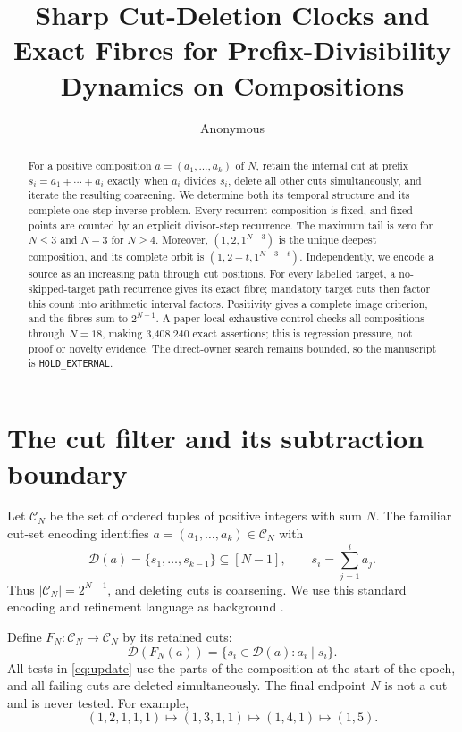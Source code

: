 \documentclass[a4paper,10pt]{amsart}
\title[Prefix-divisibility cut dynamics]{Sharp Cut-Deletion Clocks and Exact
Fibres for Prefix-Divisibility Dynamics on Compositions}
\author{Anonymous}
\date{}
\theoremstyle{remark}
\newcommand{\Comp}{\mathcal C}
\newcommand{\Cuts}{\mathcal D}
\begin{document}
\begin{abstract}
For a positive composition $a=(a_1,\ldots,a_k)$ of $N$, retain the internal
cut at prefix $s_i=a_1+\cdots+a_i$ exactly when $a_i$ divides $s_i$, delete
all other cuts simultaneously, and iterate the resulting coarsening.  We
determine both its temporal structure and its complete one-step inverse
problem.  Every recurrent composition is fixed, and fixed points are counted
by an explicit divisor-step recurrence.  The maximum tail is zero for
$N\leq3$ and $N-3$ for $N\geq4$.  Moreover,
$(1,2,1^{N-3})$ is the unique deepest composition, and its complete orbit is
$(1,2+t,1^{N-3-t})$.  Independently, we encode a source as an increasing
path through cut positions.  For every labelled target, a no-skipped-target
path recurrence gives its exact fibre; mandatory target cuts then factor this
count into arithmetic interval factors.  Positivity gives a complete image
criterion, and the fibres sum to $2^{N-1}$.  A paper-local exhaustive control
checks all compositions through $N=18$, making 3,408,240 exact assertions;
this is regression pressure, not proof or novelty evidence.  The direct-owner
search remains bounded, so the manuscript is \texttt{HOLD\_EXTERNAL}.
\end{abstract}

\maketitle

\section{The cut filter and its subtraction boundary}

Let $\Comp_N$ be the set of ordered tuples of positive integers with sum
$N$.  The familiar cut-set encoding identifies
$a=(a_1,\ldots,a_k)\in\Comp_N$ with
\begin{equation}\label{eq:cuts}
 \Cuts(a)=\{s_1,\ldots,s_{k-1}\}\subseteq[N-1],\qquad
 s_i=\sum_{j=1}^i a_j.
\end{equation}
Thus $|\Comp_N|=2^{N-1}$, and deleting cuts is coarsening.  We use this
standard encoding and refinement language as background
\cite{Stanley2011EC1,BilleraThomasVanWilligenburg2006}.

Define $F_N:\Comp_N\to\Comp_N$ by its retained cuts:
\begin{equation}\label{eq:update}
 \Cuts(F_N(a))=\{s_i\in\Cuts(a):a_i\mid s_i\}.
\end{equation}
All tests in \eqref{eq:update} use the parts of the composition at the start
of the epoch, and all failing cuts are deleted simultaneously.  The final
endpoint $N$ is not a cut and is never tested.  For example,
\begin{equation}\label{eq:orbit-example}
 (1,2,1,1,1)\longmapsto(1,3,1,1)
 \longmapsto(1,4,1)\longmapsto(1,5).
\end{equation}
\end{document}
